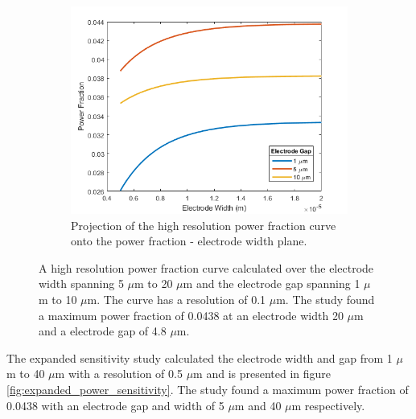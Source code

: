 \begin{figure}[h]
\begin{subfigure}[b]{0.49\textwidth}
    \end{subfigure}
    \hfill
    \begin{subfigure}[b]{0.49\textwidth}
        \centering
        \includegraphics[width=\textwidth]{images/hiResPowerVsWidth.png}
        \caption{Projection of the high resolution power fraction curve onto the power fraction - electrode width plane.}
    \end{subfigure}
    \caption[High resolution power fractino curve.]{A high resolution power fraction curve calculated over the electrode width spanning 5 $\mu$m to 20 $\mu$m and the electrode gap spanning 1 $\mu$m to 10 $\mu$m. The curve has a resolution of 0.1 $\mu$m. The study found a maximum power fraction of 0.0438 at an electrode width 20 $\mu$m and a electrode gap of 4.8 $\mu$m.}
    \label{fig:high_resolution_power_fraction}
\end{figure}

\par The expanded sensitivity study calculated the electrode width and gap from 1 $\mu$m to 40 $\mu$m with a resolution of 0.5 $\mu$m and is presented in figure \ref{fig:expanded_power_sensitivity}. The study found a maximum power fraction of 0.0438 with an electrode gap and width of 5 $\mu$m and 40 $\mu$m respectively.  

